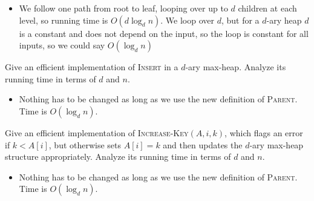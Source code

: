 \documentclass{article}
\begin{document}
\begin{description}
\begin{itemize}
  \item We follow one path from root to leaf, looping over up to $d$
    children at each level, so running time is $O(d\log_d
n)$.  We loop over $d$, but for a $d$-ary heap $d$ is a constant and
does not depend on the input, so the loop is constant for all inputs,
so we could say $O(\log_d n)$
\end{itemize}


     \item Give an efficient implementation of \textsc{Insert} in
       a $d$-ary max-heap.  Analyze its running time in terms of $d$
       and $n$.



       \begin{itemize}\item         
Nothing has to be changed as long as we use the new definition of
\textsc{Parent}.  Time is $O(\log_d n)$.
       \end{itemize}


     \item Give an efficient implementation of
       \textsc{Increase-Key}$(A,i,k)$,
       which flags an error if $k < A[i]$, but otherwise sets $A[i] =
       k$ and then updates the $d$-ary max-heap structure
       appropriately.    Analyze its running time in terms of $d$
       and $n$.



       \begin{itemize}\item         
Nothing has to be changed as long as we use the new definition of
\textsc{Parent}.   Time is $O(\log_d n)$.
       \end{itemize}


\end{description}
\end{document}
